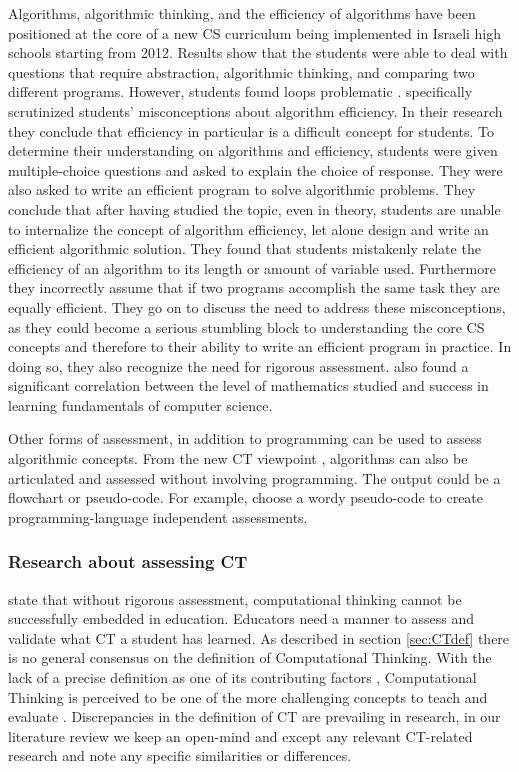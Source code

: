 Algorithms, algorithmic thinking, and the efficiency of algorithms have been positioned at the core of a new CS curriculum being implemented in Israeli high schools starting from 2012. Results show that the students were able to deal with questions that require abstraction, algorithmic thinking, and comparing two different programs. However, students found loops problematic \cite{zur-burgury2013israelExam}.  specifically scrutinized students' misconceptions about algorithm efficiency. In their research they conclude that efficiency in particular is a difficult concept for students. To determine their understanding on algorithms and efficiency, students were given multiple-choice questions and asked to explain the choice of response. They were also asked to write an efficient program to solve algorithmic problems. They conclude that after having studied the topic, even in theory, students are unable to internalize the concept of algorithm efficiency, let alone design and write an efficient algorithmic solution. They found that students mistakenly relate the efficiency of an algorithm to its length or amount of variable used. Furthermore they incorrectly assume that if two programs accomplish the same task they are equally efficient. They go on to discuss the need to address these misconceptions, as they could become a serious stumbling block to understanding the core CS concepts and therefore to their ability to write an efficient program in practice. In doing so, they also recognize the need for rigorous assessment.  also found a significant correlation between the level of mathematics studied and success in learning fundamentals of computer science.


Other forms of assessment, in addition to programming can be used to assess algorithmic concepts. From the new CT viewpoint \cite{denning2017remaining}, algorithms can also be articulated and assessed without involving programming. The output could be a flowchart \cite{Smetsers2017} or pseudo-code. For example,  choose a wordy pseudo-code to create programming-language independent assessments.


\subsubsection{Research about assessing CT}

 state that without rigorous assessment, computational thinking cannot be successfully embedded in education. Educators need a manner to assess and validate what CT a student has learned. As described in section \ref{sec:CTdef} there is no general consensus on the definition of Computational Thinking. With the lack of a precise definition as one of its contributing factors \cite{crick2017}, Computational Thinking is perceived to be one of the more challenging concepts to teach and evaluate \cite{BrennanResnick2012}. Discrepancies in the definition of CT are prevailing in research, in our literature review we keep an open-mind and except any relevant CT-related research and note any specific similarities or differences.


